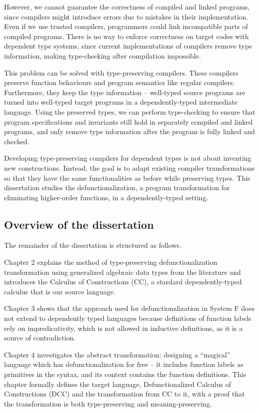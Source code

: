However, we cannot guarantee the correctness of compiled and linked programs, since compilers might introduce errors due to mistakes in their implementation. Even if we use trusted compilers, programmers could link incompatible parts of compiled programs. There is no way to enforce correctness on target codes with dependent type systems, since current implementations of compilers remove type information, making type-checking after compilation impossible.

This problem can be solved with type-preserving compilers. These compilers preserve function behaviours and program semantics like regular compilers. Furthermore, they keep the type information – well-typed source programs are turned into well-typed target programs in a dependently-typed intermediate language. Using the preserved types, we can perform type-checking to ensure that program specifications and invariants still hold in separately compiled and linked programs, and only remove type information after the program is fully linked and checked.

Developing type-preserving compilers for dependent types is not about inventing new constructions. Instead, the goal is to adapt existing compiler transformations so that they have the same functionalities as before while preserving types. This dissertation studies the defunctionalization, a program transformation for eliminating higher-order functions, in a dependently-typed setting.

\subsection*{Overview of the dissertation}

The remainder of the dissertation is structured as follows.

Chapter 2 explains the method of type-preserving defunctionalization transformation using generalized algebraic data types from the literature and introduces the Calculus of Constructions (CC), a stardard dependently-typed calculus that is our source language.

Chapter 3 shows that the approach used for defunctionalization in System F does not extend to dependently typed languages because definitions of function labels rely on impredicativity, which is not allowed in inductive definitions, as it is a source of contradiction.

Chapter 4 investigates the abstract transformation: designing a “magical” language which has defunctionalization for free – it includes function labels as primitives in the syntax, and its context contains the function definitions. This chapter formally defines the target language, Defunctionalized Calculus of Constructions (DCC) and the transformation from CC to it, with a proof that the transformation is both type-preserving and meaning-preserving.

